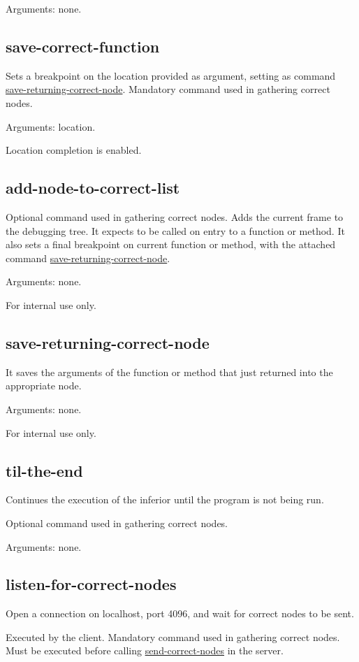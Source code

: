 Arguments: none.
\subsection{save-correct-function}
\label{command:save-correct-function}
Sets a breakpoint on the location provided as argument, setting as command \hyperref[command:save-returning-correct-node]{save-returning-correct-node}. Mandatory command used in gathering correct nodes.

Arguments: location.

Location completion is enabled.
\subsection{add-node-to-correct-list}
\label{command:add-node-to-correct-list}
Optional command used in gathering correct nodes.
Adds the current frame to the debugging tree.
It expects to be called on entry to a function or method.
It also sets a final breakpoint on current function or method, with the attached command \hyperref[command:save-returning-correct-node]{save-returning-correct-node}.

Arguments: none.

For internal use only.
\subsection{save-returning-correct-node}
\label{command:save-returning-correct-node}
It saves the arguments of the function or method that just returned into the appropriate node.

Arguments: none.

For internal use only.
\subsection{til-the-end}
\label{command:til-the-end}
Continues the execution of the inferior until the program is not being run.

Optional command used in gathering correct nodes.

Arguments: none.
\subsection{listen-for-correct-nodes}
\label{command:listen-for-correct-nodes}
Open a connection on localhost, port 4096, and wait for correct nodes to be sent.

Executed by the client.
Mandatory command used in gathering correct nodes.
Must be executed before calling \hyperref[command:send-correct-nodes]{send-correct-nodes} in the server.

